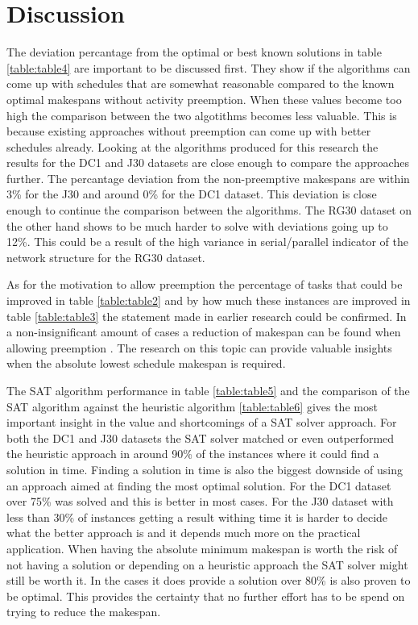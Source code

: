 \section{Discussion}
The deviation percantage from the optimal or best known solutions in table \ref{table:table4} are important to be discussed first. They show if the algorithms can come up with schedules that are somewhat reasonable compared to the known optimal makespans without activity preemption. When these values become too high the comparison between the two algotithms becomes less valuable. This is because existing approaches without preemption can come up with better schedules already.
Looking at the algorithms produced for this research the results for the DC1 and J30 datasets are close enough to compare the approaches further. The percantage deviation from the non-preemptive makespans are within 3\% for the J30 and around 0\% for the DC1 dataset. This deviation is close enough to continue the comparison between the algorithms. The RG30 dataset on the other hand shows to be much harder to solve with deviations going up to 12\%. This could be a result of the high variance in serial/parallel indicator of the network structure for the RG30 dataset.

As for the motivation to allow preemption the percentage of tasks that could be improved in table \ref{table:table2} and by how much these instances are improved in table \ref{table:table3} the statement made in earlier research could be confirmed. In a non-insignificant amount of cases a reduction of makespan can be found when allowing preemption \cite{RN1}. The research on this topic can provide valuable insights when the absolute lowest schedule makespan is required.

The SAT algorithm performance in table \ref{table:table5} and the comparison of the SAT algorithm against the heuristic algorithm \ref{table:table6} gives the most important insight in the value and shortcomings of a SAT solver approach. For both the DC1 and J30 datasets the SAT solver matched or even outperformed the heuristic approach in around 90\% of the instances where it could find a solution in time. Finding a solution in time is also the biggest downside of using an approach aimed at finding the most optimal solution. For the DC1 dataset over 75\% was solved and this is better in most cases. For the J30 dataset with less than 30\% of instances getting a result withing time it is harder to decide what the better approach is and it depends much more on the practical application. When having the absolute minimum makespan is worth the risk of not having a solution or depending on a heuristic approach the SAT solver might still be worth it. In the cases it does provide a solution over 80\% is also proven to be optimal. This provides the certainty that no further effort has to be spend on trying to reduce the makespan.

